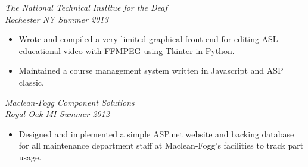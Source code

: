 \documentclass[line]{res}
\begin{document}
\begin{resume}
\begin{multicols}{2}
\textit{The National Technical Institue for the Deaf\\ Rochester NY \hfill{Summer 2013}}
\begin{itemize}
    \item Wrote and compiled a very limited graphical front end for editing ASL educational video with FFMPEG using Tkinter in Python.
    \item Maintained a course management system written in Javascript and ASP classic.
\end{itemize}

\textit{Maclean-Fogg Component Solutions\\ Royal Oak MI \hfill{Summer 2012}}
\begin{itemize}
    \item Designed and implemented a simple ASP.net website and backing database for all maintenance 
          department staff at Maclean-Fogg's facilities to track part usage.
\end{itemize}
\end{multicols}
\end{resume}
\end{document}
